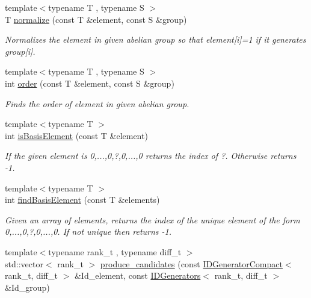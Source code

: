 \begin{DoxyCompactItemize}
\item 
{\footnotesize template$<$typename T , typename S $>$ }\\T \hyperlink{namespaceMackey_a6aa639a1f656fdcccbcfa6bc719bb817}{normalize} (const T \&element, const S \&group)
\begin{DoxyCompactList}\small\item\em Normalizes the element in given abelian group so that element\mbox{[}i\mbox{]}=1 if it generates group\mbox{[}i\mbox{]}. \end{DoxyCompactList}\item 
{\footnotesize template$<$typename T , typename S $>$ }\\int \hyperlink{namespaceMackey_a4abdca157edcf425b1e7ceff39d74c2f}{order} (const T \&element, const S \&group)
\begin{DoxyCompactList}\small\item\em Finds the order of element in given abelian group. \end{DoxyCompactList}\item 
{\footnotesize template$<$typename T $>$ }\\int \hyperlink{namespaceMackey_a69fa6a0eac2520c76251b0799fa9357f}{is\+Basis\+Element} (const T \&element)
\begin{DoxyCompactList}\small\item\em If the given element is 0,...,0,?,0,...,0 returns the index of ?. Otherwise returns -\/1. \end{DoxyCompactList}\item 
{\footnotesize template$<$typename T $>$ }\\int \hyperlink{namespaceMackey_ab5bc349f95c14d448e42622de2d6a448}{find\+Basis\+Element} (const T \&elements)
\begin{DoxyCompactList}\small\item\em Given an array of elements, returns the index of the unique element of the form 0,...,0,?,0,...,0. If not unique then returns -\/1. \end{DoxyCompactList}\item 
{\footnotesize template$<$typename rank\+\_\+t , typename diff\+\_\+t $>$ }\\std\+::vector$<$ rank\+\_\+t $>$ \hyperlink{namespaceMackey_a417d303e187dac5a1a2c2c02c6267758}{produce\+\_\+candidates} (const \hyperlink{classMackey_1_1IDGeneratorCompact}{I\+D\+Generator\+Compact}$<$ rank\+\_\+t, diff\+\_\+t $>$ \&Id\+\_\+element, const \hyperlink{classMackey_1_1IDGenerators}{I\+D\+Generators}$<$ rank\+\_\+t, diff\+\_\+t $>$ \&Id\+\_\+group)

\end{DoxyCompactItemize}
